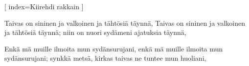 [%
index={Kiirehdi rakkain}
]

\beginverse
Taivas on sininen ja valkoinen
ja tähtösiä täynnä,
Taivas on sininen ja valkoinen
ja tähtösiä täynnä;
\lrep niin on nuori sydämeni
ajatuksia täynnä,\rrep
\endverse

\beginverse
Enkä mä muille ilmoita
mun sydänsurujani,
enkä mä muille ilmoita
mun sydänsurujani;
\lrep synkkä metsä, kirkas taivas
ne tuntee mun huoliani, \rrep
\endverse

\endsong